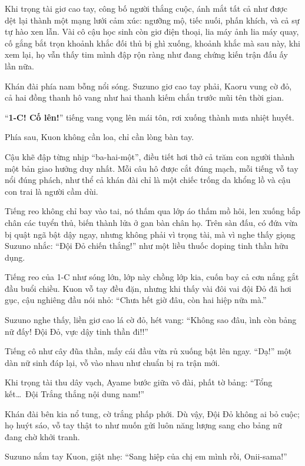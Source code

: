 \documentclass[../main.tex]{subfiles}
\begin{document}
Khi trọng tài giơ cao tay, công bố người thắng cuộc, ánh mắt tất cả như được dệt lại thành một mạng lưới cảm xúc: ngưỡng mộ, tiếc nuối, phấn khích, và cả sự tự hào xen lẫn. Vài cô cậu học sinh còn giơ điện thoại, lia máy ảnh lia máy quay, cố gắng bắt trọn khoảnh khắc đối thủ bị ghì xuống, khoảnh khắc mà sau này, khi xem lại, họ vẫn thấy tim mình đập rộn ràng như đang chứng kiến trận đấu ấy lần nữa.

Khán đài phía nam bỗng nổi sóng. Suzuno giơ cao tay phải, Kaoru vung cờ đỏ, cả hai đồng thanh hô vang như hai thanh kiếm chắn trước mũi tên thời gian.

``\textbf{1-C! Cố lên!}'' tiếng vang vọng lên mái tôn, rơi xuống thành mưa nhiệt huyết.

Phía sau, Kuon không cần loa, chỉ cần lòng bàn tay.

Cậu khẽ đập từng nhịp ``ba-hai-một'', điều tiết hơi thở cả trăm con người thành một bản giao hưởng duy nhất. Mỗi câu hô được cắt đúng mạch, mỗi tiếng vỗ tay nổi đúng phách, như thể cả khán đài chỉ là một chiếc trống da khổng lồ và cậu con trai là người cầm dùi.

Tiếng reo không chỉ bay vào tai, nó thấm qua lớp áo thấm mồ hôi, len xuống bắp chân các tuyển thủ, biến thành lửa ở gan bàn chân họ. Trên sàn đấu, có đứa vừa bị quật ngã bật dậy ngay, nhưng không phải vì trọng tài, mà vì nghe thấy giọng Suzuno nhắc: ``Đội Đỏ chiến thắng!'' như một liều thuốc doping tinh thần hữu dụng.

Tiếng reo của 1-C như sóng lớn, lớp này chồng lớp kia, cuốn bay cả cơn nắng gắt đầu buổi chiều.   Kuon vỗ tay đều đặn, nhưng khi thấy vài đôi vai đội Đỏ đã hơi gục, cậu nghiêng đầu nói nhỏ: ``Chưa hết giờ đâu, còn hai hiệp nữa mà.''

Suzuno nghe thấy, liền giơ cao lá cờ đỏ, hét vang: ``Không sao đâu, ình còn bảng nữ đấy! Đội Đỏ, vực dậy tinh thần đi!!''

Tiếng cô như cây đũa thần, mấy cái đầu vừa rủ xuống bật lên ngay. ``Dạ!'' một dàn nữ sinh đáp lại, vỗ vào nhau như chuẩn bị ra trận mới.

Khi trọng tài thu dây vạch, Ayame bước giữa võ đài, phất tờ bảng: ``Tổng kết\dots\ Đội Trắng thắng nội dung nam!''

Khán đài bên kia nổ tung, cờ trắng phấp phới. Dù vậy, Đội Đỏ không ai bỏ cuộc; họ huýt sáo, vỗ tay thật to như muốn gửi luôn năng lượng sang cho bảng nữ đang chờ khởi tranh.

Suzuno nắm tay Kuon, giật nhẹ: ``Sang hiệp của chị em mình rồi, Onii-sama!''
\end{document}

